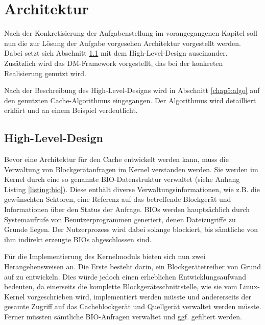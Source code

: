 \chapter{Architektur}
\label{chap5}

Nach der Konkretisierung der Aufgabenstellung im vorangegangenen Kapitel soll nun die zur Lösung der Aufgabe vorgesehen Architektur vorgestellt
werden. Dabei setzt sich Abschnitt \ref{chap5:hld} mit dem High-Level-Design auseinander. Zusätzlich wird das \ac{DM}-Framework vorgestellt, das bei der
konkreten Realisierung genutzt wird.

Nach der Beschreibung des High-Level-Designs wird in Abschnitt \ref{chap5:algo} auf den genutzten Cache-Algorithmus eingegangen. Der Algorithmus wird
detailliert erklärt und an einem Beispiel verdeutlicht.

\section{High-Level-Design}
\label{chap5:hld}

Bevor eine Architektur für den Cache entwickelt werden kann, muss die Verwaltung von Blockgerätanfragen im Kernel verstanden werden. Sie werden im Kernel durch
eine so genannte \ac{BIO}-Datenstruktur verwaltet (siehe Anhang Listing \ref{listing:bio}). Diese enthält diverse Verwaltungsinformationen, wie z.B. die
gewünschten Sektoren, eine Referenz auf das betreffende Blockgerät und Informationen über den Status der Anfrage. \acp{BIO} werden hauptsächlich durch Systemaufrufe von Benutzerprogrammen
generiert, denen Dateizugriffe zu Grunde liegen. Der Nutzerprozess wird dabei solange blockiert, bis sämtliche von ihm indirekt erzeugte \acp{BIO}
abgeschlossen sind.

Für die Implementierung des Kernelmoduls bieten sich nun zwei Herangehensweisen an. Die Erste besteht darin, ein Blockgerätetreiber von Grund auf zu entwickeln.
Dies würde jedoch einen erheblichen Entwicklungsaufwand bedeuten, da einerseits die komplette Blockgeräteschnittstelle, wie sie vom Linux-Kernel vorgeschrieben
wird, implementiert werden müsste und andererseits der gesamte Zugriff auf das Cacheblockgerät und Quellgerät verwaltet werden müsste. Ferner müssten sämtliche
\ac{BIO}-Anfragen verwaltet und ggf. gefiltert werden.

